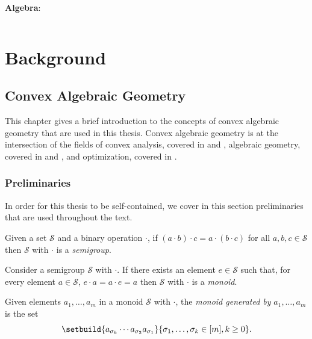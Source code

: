 \documentclass[11pt,twoside,a4paper,openright]{uclouvain-thesis}
\newenvironment{notationlist}[1]
{\vspace{1em}

\noindent
\textbf{#1}:


\begin{longtable}{p{0.5\textwidth}p{0.48\textwidth}}}
{\end{longtable}}
\begin{document}
\begin{notationlist}{Algebra}
\end{notationlist}

\part{Background}

\chapter{Convex Algebraic Geometry}
\label{chap:conv}

This chapter gives a brief introduction to the concepts of convex algebraic geometry that are used in this thesis.
Convex algebraic geometry is at the intersection of the fields of convex analysis, covered in  and , algebraic geometry, covered in  and , and optimization, covered in .



\section{Preliminaries}

In order for this thesis to be self-contained, we cover in this section
preliminaries that are used throughout the text.

\begin{mydef}[Semigroup]
  Given a set $\mathcal{S}$ and a binary operation $\cdot$,
  if $(a \cdot b) \cdot c = a \cdot (b \cdot c)$ for all $a, b, c \in \mathcal{S}$
  then $\mathcal{S}$ with $\cdot$ is a \emph{semigroup}.
\end{mydef}

\begin{mydef}[Monoid]
  Consider a semigroup $\mathcal{S}$ with $\cdot$.
  If there exists an element $e \in \mathcal{S}$ such that,
  for every element $a \in \mathcal{S}$,
  $e \cdot a = a \cdot e = a$
  then $\mathcal{S}$ with $\cdot$ is a \emph{monoid}.
\end{mydef}

\begin{mydef}
  \label{def:monoidgen}
  Given elements $a_1, \ldots, a_m$ in a monoid $\mathcal{S}$ with $\cdot$,
  the \emph{monoid generated by} $a_1, \ldots, a_m$ is the set
  \[ \setbuild{a_{\sigma_{k}} \cdots a_{\sigma_2} a_{\sigma_1}}{\sigma_1, \ldots, \sigma_k \in [m], k \ge 0}. \]
\end{mydef}
\end{document}
